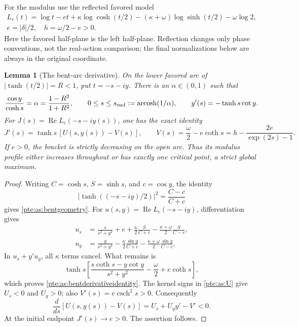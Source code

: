 \documentclass[11pt,a4paper]{article}
\numberwithin{equation}{section}
\newtheorem{lemma}[theorem]{Lemma}
\theoremstyle{definition}
\theoremstyle{plain}
\begin{document}
For the modulus use the reflected favored model
\begin{gather*}
 L_c(t)=\log t-e t+\kappa\log\cosh(t/2)
                 -(\kappa+\omega)\log\sinh(t/2)-\omega\log2,\\
 e=|\delta|/2,\quad h=\omega/2-e>0.
\end{gather*}
Here the favored half-plane is the left half-plane.  Reflection changes
only phase conventions, not the real-action comparison; the final
normalizations below are always in the original coordinate.

\begin{lemma}[The bent-arc derivative]\label{pte:as:bentderivative}
On the lower favored arc of $|\tanh(t/2)|=R<1$, put $t=-s-iy$.
There is an $\alpha\in(0,1)$ such that
\begin{equation}\label{pte:as:bentgeometry}
 \frac{\cos y}{\cosh s}=\alpha=\frac{1-R^2}{1+R^2},\qquad
 0\le s\le s_{\rm end}:=\operatorname{arcosh}(1/\alpha),\qquad
 y'(s)=-\tanh s\cot y.
\end{equation}
For $J(s)=\operatorname{Re}L_c(-s-iy(s))$, one has the exact identity
\begin{equation}\label{pte:as:bentderivativeidentity}
 J'(s)=\tanh s\,[U(s,y(s))-V(s)],
 \qquad V(s)=\frac\omega2-e\coth s
            =h-\frac{2e}{\exp(2s)-1}.
\end{equation}
If $e>0$, the bracket is strictly decreasing on the open arc.  Thus its
modulus profile either increases throughout or has exactly one critical
point, a strict global maximum.
\end{lemma}
\begin{proof}
Writing $C=\cosh s$, $S=\sinh s$, and $c=\cos y$, the identity
\[
 |\tanh((-s-iy)/2)|^2=\frac{C-c}{C+c}
\]
gives \eqref{pte:as:bentgeometry}.  For
$u(s,y)=\operatorname{Re}L_c(-s-iy)$, differentiation gives
\begin{align*}
 u_s&=\frac{s}{s^2+y^2}+e
       +\frac\kappa2\frac{S}{C+c}
       -\frac{\kappa+\omega}{2}\frac{S}{C-c},\\
 u_y&=\frac{y}{s^2+y^2}
       -\frac\kappa2\frac{\sin y}{C+c}
       -\frac{\kappa+\omega}{2}\frac{\sin y}{C-c}.
\end{align*}
In $u_s+y'u_y$, all $\kappa$ terms cancel.  What remains is
\[
 \tanh s\left[
   \frac{s\coth s-y\cot y}{s^2+y^2}-\frac\omega2+e\coth s
 \right],
\]
which proves \eqref{pte:as:bentderivativeidentity}.  The kernel signs in
\eqref{pte:as:U} give $U_s<0$ and $U_y>0$; also $V'(s)=e\operatorname{csch}^2s>0$.
Consequently
\begin{equation}\label{pte:as:bentstrict}
 \frac d{ds}[U(s,y(s))-V(s)]
       =U_s+U_y y'-V'<0.
\end{equation}
At the initial endpoint $J'(s)\to e>0$.  The assertion follows.
\end{proof}
\end{document}
